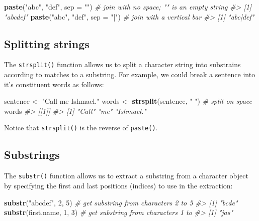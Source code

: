 \documentclass[]{book}
\newenvironment{Shaded}{\begin{snugshade}}{\end{snugshade}}
\newcommand{\CommentTok}[1]{\textcolor[rgb]{0.56,0.35,0.01}{\textit{#1}}}
\newcommand{\DataTypeTok}[1]{\textcolor[rgb]{0.13,0.29,0.53}{#1}}
\newcommand{\DecValTok}[1]{\textcolor[rgb]{0.00,0.00,0.81}{#1}}
\newcommand{\KeywordTok}[1]{\textcolor[rgb]{0.13,0.29,0.53}{\textbf{#1}}}
\newcommand{\NormalTok}[1]{#1}
\newcommand{\StringTok}[1]{\textcolor[rgb]{0.31,0.60,0.02}{#1}}
\theoremstyle{definition}
\theoremstyle{definition}
\theoremstyle{definition}
\theoremstyle{remark}
\begin{document}
\begin{Shaded}
\begin{Highlighting}[]
\KeywordTok{paste}\NormalTok{(}\StringTok{"abc"}\NormalTok{, }\StringTok{"def"}\NormalTok{, }\DataTypeTok{sep =} \StringTok{""}\NormalTok{)  }\CommentTok{# join with no space; "" is an empty string}
\CommentTok{#> [1] "abcdef"}
\KeywordTok{paste}\NormalTok{(}\StringTok{"abc"}\NormalTok{, }\StringTok{"def"}\NormalTok{, }\DataTypeTok{sep =} \StringTok{"|"}\NormalTok{) }\CommentTok{# join with a vertical bar}
\CommentTok{#> [1] "abc|def"}
\end{Highlighting}
\end{Shaded}

\hypertarget{splitting-strings}{%
\subsection{Splitting strings}\label{splitting-strings}}

The \texttt{strsplit()} function allows us to split a character string
into substrains according to matches to a substring. For example, we
could break a sentence into it's constituent words as follows:

\begin{Shaded}
\begin{Highlighting}[]
\NormalTok{sentence <-}\StringTok{ "Call me Ishmael."}
\NormalTok{words <-}\StringTok{ }\KeywordTok{strsplit}\NormalTok{(sentence, }\StringTok{" "}\NormalTok{)  }\CommentTok{# split on space}
\NormalTok{words}
\CommentTok{#> [[1]]}
\CommentTok{#> [1] "Call"     "me"       "Ishmael."}
\end{Highlighting}
\end{Shaded}

Notice that \texttt{strsplit()} is the reverse of \texttt{paste()}.

\hypertarget{substrings}{%
\subsection{Substrings}\label{substrings}}

The \texttt{substr()} function allows us to extract a substring from a
character object by specifying the first and last positions (indices) to
use in the extraction:

\begin{Shaded}
\begin{Highlighting}[]
\KeywordTok{substr}\NormalTok{(}\StringTok{"abcdef"}\NormalTok{, }\DecValTok{2}\NormalTok{, }\DecValTok{5}\NormalTok{)  }\CommentTok{# get substring from characters 2 to 5}
\CommentTok{#> [1] "bcde"}
\KeywordTok{substr}\NormalTok{(first.name, }\DecValTok{1}\NormalTok{, }\DecValTok{3}\NormalTok{) }\CommentTok{# get substring from characters 1 to       }
\CommentTok{#> [1] "jas"}
\end{Highlighting}
\end{Shaded}
\end{document}
